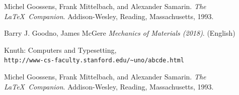 \documentclass[12pt]{article}
\begin{document}
\pagebreak
\begin{thebibliography}{9}
  Michel Goossens, Frank Mittelbach, and Alexander Samarin. 
  \textit{The \LaTeX\ Companion}. 
  Addison-Wesley, Reading, Massachusetts, 1993.
   
  Barry J. Goodno, James McGere
  \textit{Mechanics of Materials (2018)}. (English)  
  
   
  Knuth: Computers and Typesetting,
  \\\texttt{http://www-cs-faculty.stanford.edu/\~{}uno/abcde.html}

  Michel Goossens, Frank Mittelbach, and Alexander Samarin. 
  \textit{The \LaTeX\ Companion}. 
  Addison-Wesley, Reading, Massachusetts, 1993.

\end{thebibliography}
\end{document}
